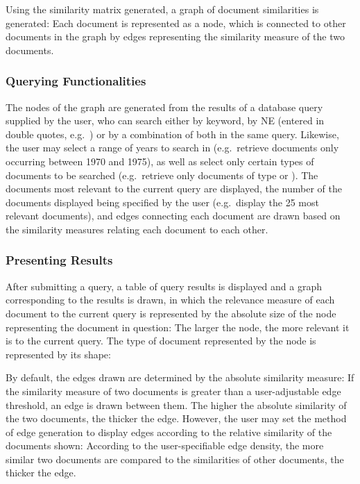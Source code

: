 Using the similarity matrix generated, a graph of document similarities is generated: Each document is represented as a node, which is connected to other documents in the graph by edges representing the similarity measure of the two documents.

\subsubsection {Querying Functionalities}
\label{sec:querying_functionalities}
The nodes of the graph are generated from the results of a database query supplied by the user, who can search either by keyword, by NE (entered in double quotes, e.g.\ ) or by a combination of both in the same query. Likewise, the user may select a range of years to search in (e.g.\ retrieve documents only occurring between 1970 and 1975), as well as select only certain types of documents to be searched (e.g.\ retrieve only documents of type  or ). The documents most relevant to the current query are displayed, the number of the documents displayed being specified by the user (e.g.\ display the 25 most relevant documents), and edges connecting each document are drawn based on the similarity measures relating each document to each other.

\subsubsection {Presenting Results}
\label{sec:presenting_results}
After submitting a query, a table of query results is displayed and a graph corresponding to the results is drawn, in which the relevance measure of each document to the current query is represented by the absolute size of the node representing the document in question: The larger the node, the more relevant it is to the current query. The type of document represented by the node is represented by its shape: 

By default, the edges drawn are determined by the absolute similarity measure: If the similarity measure of two documents is greater than a user-adjustable edge threshold, an edge is drawn between them. The higher the absolute similarity of the two documents, the thicker the edge. However, the user may set the method of edge generation to display edges according to the relative similarity of the documents shown: According to the user-specifiable edge density, the more similar two documents are compared to the similarities of other documents, the thicker the edge.

